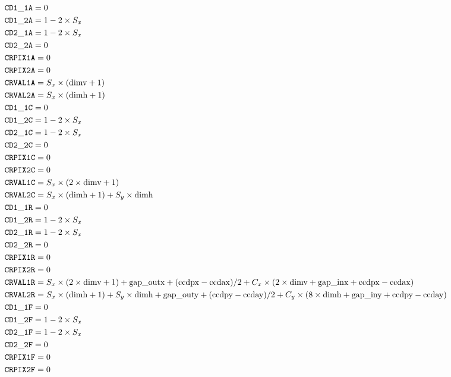 \documentclass{article}[12pt]
\begin{document}
\begin{table}
\begin{align*}
& {\tt CD1\_1A} = 0 \\
& {\tt CD1\_2A} = 1 - 2 \times S_x \\
& {\tt CD2\_1A} = 1 - 2 \times S_x \\
& {\tt CD2\_2A} = 0 \\
& {\tt CRPIX1A} = 0 \\
& {\tt CRPIX2A} = 0 \\
& {\tt CRVAL1A }= S_x \times ({\rm dimv} + 1) \\
& {\tt CRVAL2A} = S_x \times ({\rm dimh} + 1) \\
& {\tt CD1\_1C} = 0  \\
& {\tt CD1\_2C} = 1 - 2 \times S_x \\
& {\tt CD2\_1C} = 1 - 2 \times S_x \\
& {\tt CD2\_2C} = 0 \\
& {\tt CRPIX1C} = 0 \\
& {\tt CRPIX2C} = 0 \\
& {\tt CRVAL1C} = S_x \times (2 \times {\rm dimv} + 1) \\
& {\tt CRVAL2C} = S_x \times ({\rm dimh} + 1) + S_y \times {\rm dimh}  \\
& {\tt CD1\_1R} = 0  \\
& {\tt CD1\_2R} = 1 - 2 \times S_x \\
& {\tt CD2\_1R} = 1 - 2 \times S_x \\
& {\tt CD2\_2R} = 0 \\
& {\tt CRPIX1R} = 0 \\
& {\tt CRPIX2R} = 0 \\
& {\tt CRVAL1R} = S_x \times (2 \times {\rm dimv} + 1) + {\rm gap\_outx} + ({\rm ccdpx} - {\rm ccdax})/2 + C_x \times (2 \times {\rm dimv} + {\rm gap\_inx} + {\rm ccdpx} - {\rm ccdax}) \\
& {\tt CRVAL2R} = S_x \times ({\rm dimh} + 1) + S_y \times {\rm dimh} +  {\rm gap\_outy} + ({\rm ccdpy} - {\rm ccday})/2 + C_y \times ( 8 \times {\rm dimh} + {\rm gap\_iny} + {\rm ccdpy} - {\rm ccday}) \\
& {\tt CD1\_1F} = 0  \\
& {\tt CD1\_2F} = 1 - 2 \times S_x \\
& {\tt CD2\_1F} = 1 - 2 \times S_x \\
& {\tt CD2\_2F} = 0 \\
& {\tt CRPIX1F} = 0 \\
& {\tt CRPIX2F} = 0 \\

\end{align*}
\end{table}
\end{document}
